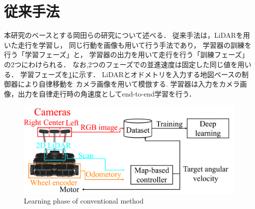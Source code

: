 \section{従来手法}
本研究のベースとする岡田らの研究について述べる．
従来手法は，LiDARを用いた走行を学習し，
同じ行動を画像も用いて行う手法であり，
学習器の訓練を行う「学習フェーズ」と，
学習器の出力を用いて走行を行う「訓練フェーズ」の2つにわけられる．
なお,2つのフェーズでの並進速度は固定した同じ値を用いる．
学習フェーズを\ref{fig::okada_method_ler}に示す．
LiDARとオドメトリを入力する地図ベースの制御器により自律移動を
カメラ画像を用いて模倣する.
学習器は入力をカメラ画像，出力を自律走行時の角速度としてend-to-end学習を行う．
\begin{figure}[h]
    \centering
    \includegraphics[width = 12cm]{./figs/system_learning_okada.pdf}
    \caption{Learning phase of conventional method}
    \label{fig::okada_method_ler}
\end{figure}

